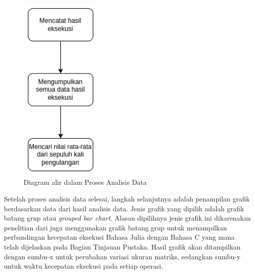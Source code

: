 \begin{figure}[h]
  \centering
  \includegraphics[width=4cm, scale=1]{schema/langkah-3.drawio.png}
  \caption{Diagram alir dalam Proses Analisis Data}
  \label{img:methods_analysist}
\end{figure}

Setelah proses analisis data selesai, langkah selanjutnya adalah penampilan
grafik berdasarkan data dari hasil analisis data. Jenis grafik yang dipilih
adalah grafik batang grup atau \emph{grouped bar chart}. Alasan dipilihnya
jenis grafik ini dikarenakan penelitian dari
\cite{hunoldBenchmarkingJuliaCommunication2020} juga menggunakan grafik batang
grup untuk menampilkan perbandingan kecepatan eksekusi Bahasa Julia dengan
Bahasa C yang mana telah dijelaskan pada Bagian Tinjauan Pustaka. Hasil grafik
akan ditampilkan dengan sumbu-x untuk perubahan variasi ukuran matriks,
sedangkan sumbu-y untuk waktu kecepatan eksekusi pada setiap operasi.



